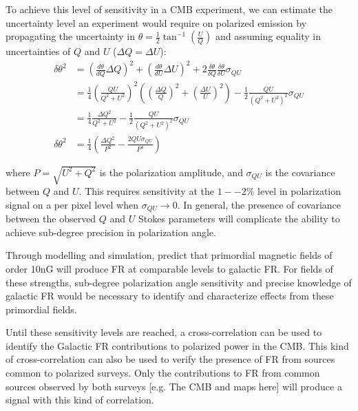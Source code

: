 \documentclass[usenatbib,hidelinks]{mnras}
\begin{document}
{To achieve this level of sensitivity in a CMB experiment, we can 
estimate the uncertainty level an experiment would require on 
polarized emission by propagating the uncertainty in {\bf $\theta=\frac{1}{2}\tan^{-1}(\frac{U}{Q})$ }and assuming equality in uncertainties of $Q$ and $U$ ($\Delta Q = \Delta U$):
{\small \begin{equation}
\begin{aligned}
	\delta \theta^{2}& =(\frac{d\theta}{dQ} \Delta Q)^{2} + (\frac{d\theta}{dU}\Delta U)^{2} + 2 \frac{\delta\theta}{\delta Q} \frac{\delta \theta}{\delta U}\sigma_{QU}\\
	& = \frac{1}{4}\left(\frac{QU}{Q^{2}+U^{2}} \right)^{2} 
	\left( \left( \frac{\Delta Q}{Q}\right)^{2}  + \left(\frac{\Delta U}{U} \right)^{2}  \right) - \frac{1}{2} \frac{QU}{(Q^{2} + U^{2})^{2} } \sigma_{QU}\\
	&= \frac{1}{4}\frac{\Delta Q^{2}}{Q^{2} + U^{2}}  - \frac{1}{2} \frac{QU}{(Q^{2} + U^{2})^{2} } \sigma_{QU}\\
	\delta \theta^{2} &= \frac{1}{4} \left( \frac{\Delta Q^{2} }{P^{2}} - \frac{2QU\sigma_{QU}}{P^{4}} \right)
\end{aligned}
\end{equation}
}%

where $P =\sqrt{U^{2} + Q^{2}}$ is the polarization amplitude, and $\sigma_{QU}$ is the covariance between $Q$ and $U$.
This requires sensitivity at the $1--2\%$ level in polarization 
signal on a per pixel level when $\sigma_{QU} \to 0$.
In general, the presence of covariance between the observed $Q$ and $U$ Stokes parameters will complicate the ability to achieve sub-degree precision in polarization angle.

Through modelling and simulation, \citet{planck:2015pmf} predict that primordial magnetic fields of order 10nG will produce FR at comparable levels to galactic FR. For fields of these strengths, sub-degree polarization angle sensitivity and precise knowledge of galactic FR would be necessary to identify and characterize effects from these primordial fields.



Until these sensitivity levels are reached, a cross-correlation
can be used to identify the Galactic FR contributions to polarized power in the CMB. 
This kind of cross-correlation can also be used to verify the presence of FR from sources common to polarized surveys. 
Only the contributions to FR from common sources observed by both surveys [e.g. The CMB and \citet{Oppermann:2014} maps here] will produce a signal with this kind of correlation.


}
\end{document}
